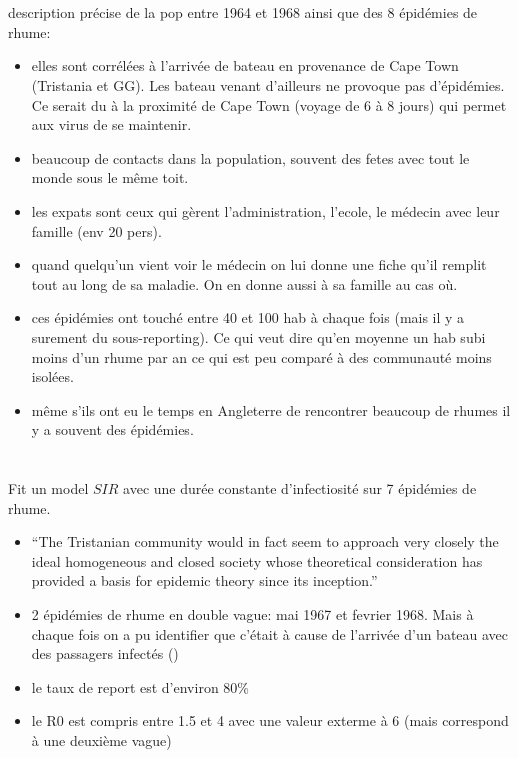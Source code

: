 \documentclass{article}
\begin{document}
\section{\citet{Shibli1971}}
description précise de la pop entre 1964 et 1968 ainsi que des 8 épidémies de rhume: 
\begin{itemize}
\item elles sont corrélées à l'arrivée de bateau en provenance de Cape Town (Tristania et GG). Les bateau venant d'ailleurs ne provoque pas d'épidémies. Ce serait du à la proximité de Cape Town (voyage de 6 à 8 jours) qui permet aux virus de se maintenir.
\item beaucoup de contacts dans la population, souvent des fetes avec tout le monde sous le même toit.
\item les expats sont ceux qui gèrent l'administration, l'ecole, le médecin avec leur famille (env 20 pers). 
\item quand quelqu'un vient voir le médecin on lui donne une fiche qu'il remplit tout au long de sa maladie. On en donne aussi à sa famille au cas où.
\item ces épidémies ont touché entre 40 et 100 hab à chaque fois (mais il y a surement du sous-reporting). Ce qui veut dire qu'en moyenne un hab subi moins d'un rhume par an ce qui est peu comparé à des communauté moins isolées.
\item même s'ils ont eu le temps en Angleterre de rencontrer beaucoup de rhumes il y a souvent des épidémies.
\end{itemize}

\section{\citet{Hammond1971}}
Fit un model $SIR$ avec une durée constante d'infectiosité sur 7 épidémies de rhume.
\begin{itemize}
\item ``The Tristanian community would in fact seem to approach very closely the ideal homogeneous and closed society whose theoretical consideration has provided a basis for epidemic theory since its inception.''
\item 2 épidémies de rhume en double vague: mai 1967 et fevrier 1968. Mais à chaque fois on a pu identifier que c'était à cause de l'arrivée d'un bateau avec des passagers infectés (\citet{Shibli1971})
\item le taux de report est d'environ 80\%
\item le R0 est compris entre 1.5 et 4 avec une valeur exterme à 6 (mais correspond à une deuxième vague)
\end{itemize}
\end{document}
